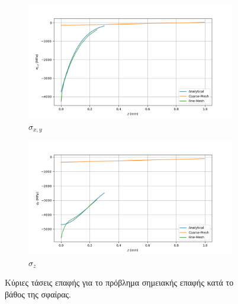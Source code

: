 \documentclass{article}
\begin{document}
\begin{figure}[H]
    \centering
    \begin{subfigure}{0.49\linewidth}
        \centering
        \includegraphics[width=\linewidth]{media/sxp.png}
        \caption{$\sigma_{x,y}$}
    \end{subfigure}
    \hfill
    \begin{subfigure}{0.49\linewidth}
        \centering
        \includegraphics[width=\linewidth]{media/szp.png}
        \caption{$\sigma_{z}$}
    \end{subfigure}
    \caption{Κύριες τάσεις επαφής για το πρόβλημα σημειακής επαφής κατά το βάθος της σφαίρας.}
    \label{fig:b4}
\end{figure}




\listoffigures
\listoftables
\end{document}
